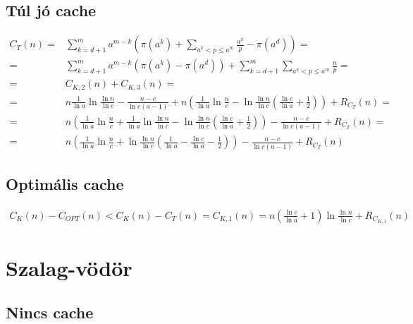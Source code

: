\documentclass{article}
\begin{document}
\subsection{Túl jó cache}

\begin{align*}
C_T(n) =& \sum_{k=d+1}^{m} a^{m-k} \left( \pi(a^k) + \sum_{a^k < p \le a^m} \frac{a^k}{p} - \pi(a^d) \right) = \\
=& \sum_{k=d+1}^{m} a^{m-k} \left( \pi(a^k) - \pi(a^d) \right) + \sum_{k=d+1}^{m} \sum_{a^k < p \le a^m} \frac{n}{p} = \\
=& C_{K,2}(n) + C_{K,3}(n) = \\
=& n \frac{1}{\ln{a}} \ln{\frac{\ln{n}}{\ln{c}}} - \frac{n - c}{\ln{c} (a-1)} + n \left( \frac{1}{\ln{a}} \ln{\frac{n}{c}} - \ln{\frac{\ln{n}}{\ln{c}}} \left( \frac{\ln{c}}{\ln{a}} + \frac{1}{2} \right) \right) + R_{C_T}(n) = \\
=& n \left( \frac{1}{\ln{a}} \ln{\frac{n}{c}} + \frac{1}{\ln{a}} \ln{\frac{\ln{n}}{\ln{c}}} - \ln{\frac{\ln{n}}{\ln{c}}} \left( \frac{\ln{c}}{\ln{a}} + \frac{1}{2} \right) \right) - \frac{n - c}{\ln{c} (a-1)} + R_{C_T}(n) = \\
=& n \left( \frac{1}{\ln{a}} \ln{\frac{n}{c}} + \ln{\frac{\ln{n}}{ \ln{c}}} \left( \frac{1}{\ln{a}} - \frac{\ln{c}}{\ln{a}} - \frac{1}{2} \right) \right) - \frac{n - c}{\ln{c} (a-1)} + R_{C_T}(n)
\end{align*}

\subsection{Optimális cache}

\begin{align*}
C_K(n)- C_{OPT}(n) < C_K(n)- C_T(n) = C_{K,1}(n) = n \left( \frac{\ln{c}}{\ln{a}} + 1 \right) \ln{\frac{\ln{n}}{\ln{c}}} + R_{C_{K,1}}(n)
\end{align*}

\section{Szalag-vödör}

\subsection{Nincs cache}
\end{document}
